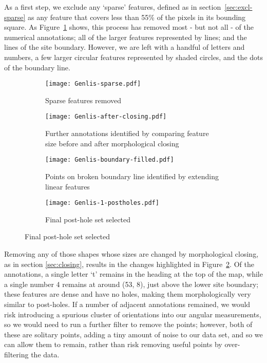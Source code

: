 \documentclass[../../ArchStats.tex]{subfiles}
\begin{document}
As a first step, we exclude any `sparse' features, defined as in section~\ref{sec:excl-sparse} as any feature that covers less than 55\% of the pixels in its bounding square. As Figure~\ref{fig:Genlis-f-ext-sparse-removed} shows, this process has removed most - but not all - of the numerical annotations; all of the larger features represented by lines; and the lines of the site boundary. However, we are left with a handful of letters and numbers, a few larger circular features represented by shaded circles, and the dots of the boundary line.

\begin{figure}[h!]
\label{fig:Genlis-f-ext}
\centering
\caption{Stages of post-hole feature identification process for the Genlis site plan. After data cleaning, we are left with 243 post-holes.}
%
\begin{subfigure}[b]{0.46\textwidth}
\caption{Sparse features removed}
\label{fig:Genlis-f-ext-sparse-removed}
\centering
\texttt{[image: Genlis-sparse.pdf]}
\end{subfigure}
%
\begin{subfigure}[b]{0.46\textwidth}
\caption{Further annotations identified by comparing feature size before and after morphological closing}
\label{fig:Genlis-f-ext-closed}
\centering
\texttt{[image: Genlis-after-closing.pdf]}
\end{subfigure}

\vspace{10pt}
%
\begin{subfigure}[b]{0.46\textwidth}
\caption{Points on broken boundary line identified by extending linear features}
\label{fig:Genlis-f-ext-boundary}
\centering
\texttt{[image: Genlis-boundary-filled.pdf]}
\end{subfigure}
%
\begin{subfigure}[b]{0.46\textwidth}
\caption{Final post-hole set selected}
\label{fig:Genlis-f-ext-postholes}
\centering
\texttt{[image: Genlis-1-postholes.pdf]}
\end{subfigure}
%
\end{figure}

Removing any of those shapes whose sizes are changed by morphological closing, as in section \ref{sec:closing}, results in the changes highlighted in Figure~\ref{fig:Genlis-f-ext-closed}. Of the annotations, a single letter `t' remains in the heading at the top of the map, while a single number 4 remains at around (53, 8), just above the lower site boundary; these features are dense and have no holes, making them morphologically very similar to post-holes. If a number of adjacent annotations remained, we would risk introducing a spurious  cluster of orientations into our angular measurements, so we would need to run a further filter to remove the points; however, both of these are solitary points, adding a tiny amount of noise to our data set, and so we can allow them to remain, rather than risk removing useful points by over-filtering the data.
\end{document}
